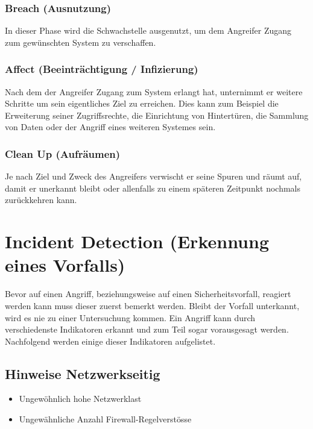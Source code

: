 \subsubsection{Breach (Ausnutzung)}
In dieser Phase wird die Schwachstelle ausgenutzt, um dem Angreifer Zugang zum gewünschten System zu verschaffen.

\subsubsection{Affect (Beeinträchtigung / Infizierung)}
Nach dem der Angreifer Zugang zum System erlangt hat, unternimmt er weitere Schritte um sein eigentliches Ziel zu erreichen. Dies kann zum Beispiel die Erweiterung seiner Zugriffsrechte, die Einrichtung von Hintertüren, die Sammlung von Daten oder der Angriff eines weiteren Systemes sein.


\subsubsection{Clean Up (Aufräumen)}
Je nach Ziel und Zweck des Angreifers verwischt er seine Spuren und räumt auf, damit er unerkannt bleibt oder allenfalls zu einem späteren Zeitpunkt nochmals zurückkehren kann.

\section{Incident Detection (Erkennung eines Vorfalls)} \label{sec:Angriffe:IncidentDetection}
Bevor auf einen Angriff, beziehungsweise auf einen Sicherheitsvorfall, reagiert werden kann muss dieser zuerst bemerkt werden. Bleibt der Vorfall unterkannt, wird es nie zu einer Untersuchung kommen.
Ein Angriff kann durch verschiedenste Indikatoren erkannt und zum Teil sogar vorausgesagt werden. Nachfolgend werden einige dieser Indikatoren aufgelistet.

\subsection{Hinweise Netzwerkseitig}
\begin{itemize}
  \item Ungewöhnlich hohe Netzwerklast
  \item Ungewähnliche Anzahl Firewall-Regelverstösse
\end{itemize}

